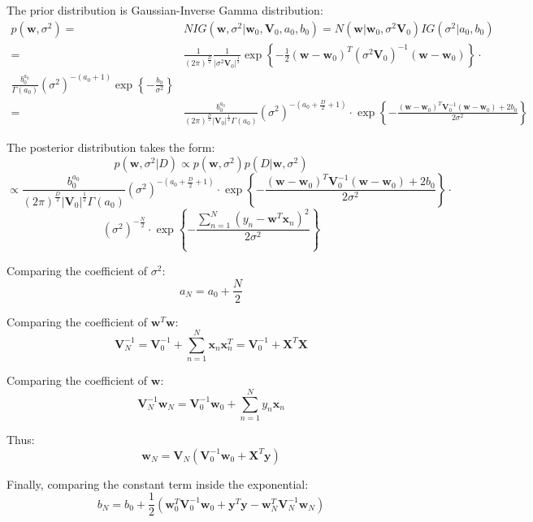 \documentclass[UTF8]{ctexart}
\begin{document}
The prior distribution is Gaussian-Inverse Gamma distribution:
\begin{align}
p(\textbf{w},\sigma^{2})=&NIG(\textbf{w},\sigma^{2}|\textbf{w}_{0},\textbf{V}_{0},a_{0},b_{0})=N(\textbf{w}|\textbf{w}_{0},\sigma^{2}\textbf{V}_{0})IG(\sigma^{2}|a_{0},b_{0})\nonumber \\
=&\frac{1}{(2\pi)^{\frac{D}{2}}}\frac{1}{|\sigma^{2}\textbf{V}_{0}|^{\frac{1}{2}}}\exp\left\{ -\frac{1}{2}(\textbf{w}-\textbf{w}_{0})^{T}(\sigma^{2}\textbf{V}_{0})^{-1}(\textbf{w}-\textbf{w}_{0}) \right\} \cdot\nonumber \\
\frac{b_{0}^{a_{0}}}{\Gamma(a_{0})}(\sigma^{2})^{-(a_{0}+1)}\exp\left\{ -\frac{b_{0}}{\sigma^{2}} \right\}\nonumber \\
=&\frac{b_{0}^{a_{0}}}{(2\pi)^{\frac{D}{2}}|\textbf{V}_{0}|^{\frac{1}{2}}\Gamma(a_{0})}(\sigma^{2})^{-(a_{0}+\frac{D}{2}+1)}\cdot\exp\left\{ -\frac{(\textbf{w}-\textbf{w}_{0})^{T}\textbf{V}_{0}^{-1}(\textbf{w}-\textbf{w}_{0})+2b_{0}}{2\sigma^{2}} \right\}\nonumber
\end{align}

The posterior distribution takes the form:
$$p(\textbf{w},\sigma^{2}|D) \propto p(\textbf{w},\sigma^{2})p(D|\textbf{w},\sigma^{2})$$
$$\propto \frac{b_{0}^{a_{0}}}{(2\pi)^{\frac{D}{2}}|\textbf{V}_{0}|^{\frac{1}{2}}\Gamma(a_{0})}(\sigma^{2})^{-(a_{0}+\frac{D}{2}+1)}\cdot\exp\left\{ -\frac{(\textbf{w}-\textbf{w}_{0})^{T}\textbf{V}_{0}^{-1}(\textbf{w}-\textbf{w}_{0})+2b_{0}}{2\sigma^{2}} \right\} \cdot$$
$$(\sigma^{2})^{-\frac{N}{2}}\cdot \exp\left\{ -\frac{\sum_{n=1}^{N}(y_{n}-\textbf{w}^{T}\textbf{x}_{n})^{2}}{2\sigma^{2}}  \right\}$$

Comparing the coefficient of $\sigma^{2}$:
$$a_{N}=a_{0}+\frac{N}{2}$$

Comparing the coefficient of $\textbf{w}^{T}\textbf{w}$:
$$\textbf{V}_{N}^{-1}=\textbf{V}_{0}^{-1}+\sum_{n=1}^{N}\textbf{x}_{n}\textbf{x}_{n}^{T}=\textbf{V}_{0}^{-1}+\textbf{X}^{T}\textbf{X}$$

Comparing the coefficient of $\textbf{w}$:
$$\textbf{V}_{N}^{-1}\textbf{w}_{N}=\textbf{V}_{0}^{-1}\textbf{w}_{0}+\sum_{n=1}^{N}y_{n}\textbf{x}_{n}$$

Thus:
$$\textbf{w}_{N}=\textbf{V}_{N}(\textbf{V}_{0}^{-1}\textbf{w}_{0}+\textbf{X}^{T}\textbf{y})$$

Finally, comparing the constant term inside the exponential:
$$b_{N}=b_{0}+\frac{1}{2}(\textbf{w}_{0}^{T}\textbf{V}_{0}^{-1}\textbf{w}_{0}+\textbf{y}^{T}\textbf{y}-\textbf{w}_{N}^{T}\textbf{V}_{N}^{-1}\textbf{w}_{N})$$
\end{document}
